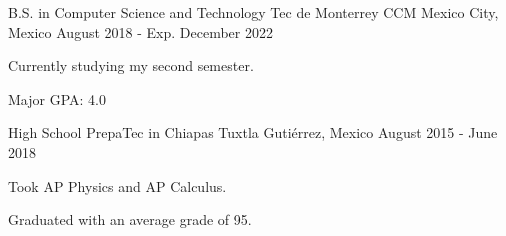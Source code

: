 

\begin{cventries}

\cventry
    {B.S. in Computer Science and Technology} %
    {Tec de Monterrey CCM} %
    {Mexico City, Mexico} %
    {August 2018 - Exp. December 2022} %
    {
      \begin{cvitems} %
        \item {Currently studying my second semester.}
        \item {Major GPA: 4.0}
      \end{cvitems}
    }

\cventry
    {High School} %
    {PrepaTec in Chiapas} %
    {Tuxtla Gutiérrez, Mexico} %
    {August 2015 - June 2018} %
    {
      \begin{cvitems} %
        \item {Took AP Physics and AP Calculus.}
        \item {Graduated with an average grade of 95.}
      \end{cvitems}
    }

\end{cventries}
